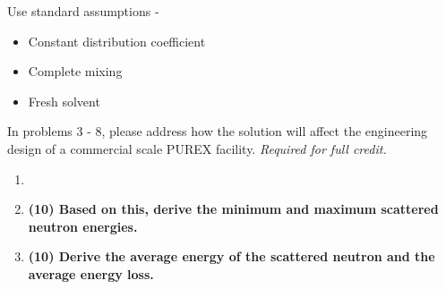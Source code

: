 \documentclass[11pt,a4paper]{article}
\begin{document}
\noindent Use standard assumptions -
\begin{itemize}[leftmargin=*,topsep=0pt,font=\bfseries]
    \item Constant distribution coefficient
    \item Complete mixing
    \item Fresh solvent
\end{itemize}
\vspace{\baselineskip}

\noindent In problems 3 - 8, please address how the solution will affect the engineering design of a commercial scale PUREX facility. \textit{Required for full credit.}

\newpage

\begin{enumerate}[leftmargin=*,topsep=0pt,font=\bfseries]
    \item\textbf{}
        \vspace{0.25in}\\
    
        
        
        
        
        
        
        
        
        
        
        
        
        
        \newpage
    \item\textbf{(10) Based on this, derive the minimum and maximum scattered neutron energies.}
        \vspace{0.25in}\\
        
        
        
        
        
        
        
        
        
        
        
        
        
        
        \newpage
    \item\textbf{(10) Derive the average energy of the scattered neutron and the average energy loss.}
        \vspace{0.25in}\\

        
        
        
        
        
        
        
        

\end{enumerate}
\end{document}
